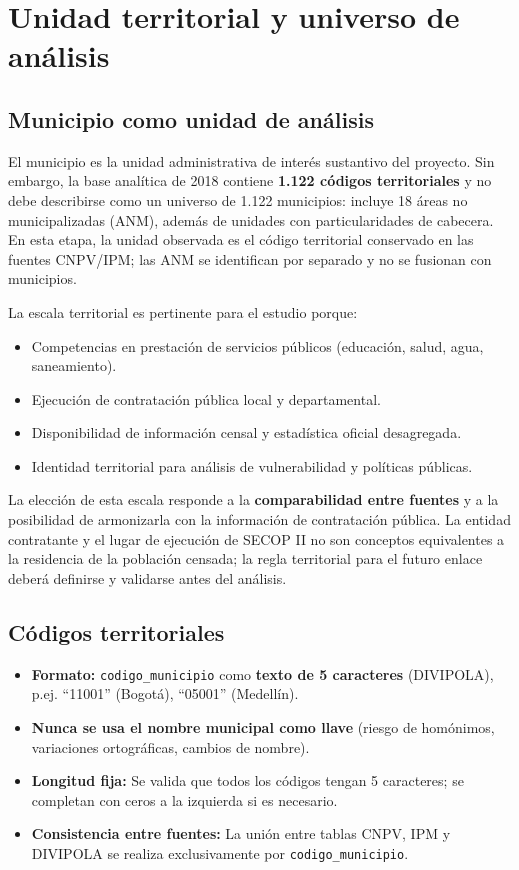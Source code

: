\section{Unidad territorial y universo de análisis}
\label{ch:unidad_analisis}

\subsection{Municipio como unidad de análisis}
\label{sec:municipio_unidad}

El municipio es la unidad administrativa de interés sustantivo del proyecto. Sin embargo, la base analítica de 2018 contiene \textbf{1.122 códigos territoriales} y no debe describirse como un universo de 1.122 municipios: incluye 18 áreas no municipalizadas (ANM), además de unidades con particularidades de cabecera. En esta etapa, la unidad observada es el código territorial conservado en las fuentes CNPV/IPM; las ANM se identifican por separado y no se fusionan con municipios.

La escala territorial es pertinente para el estudio porque:

\begin{itemize}
    \item Competencias en prestación de servicios públicos (educación, salud, agua, saneamiento).
    \item Ejecución de contratación pública local y departamental.
    \item Disponibilidad de información censal y estadística oficial desagregada.
    \item Identidad territorial para análisis de vulnerabilidad y políticas públicas.
\end{itemize}

La elección de esta escala responde a la \textbf{comparabilidad entre fuentes} y a la posibilidad de armonizarla con la información de contratación pública. La entidad contratante y el lugar de ejecución de SECOP II no son conceptos equivalentes a la residencia de la población censada; la regla territorial para el futuro enlace deberá definirse y validarse antes del análisis.

\subsection{Códigos territoriales}
\label{sec:codigos_territoriales}

\begin{itemize}
    \item \textbf{Formato:} \texttt{codigo\_municipio} como \textbf{texto de 5 caracteres} (DIVIPOLA), p.ej. ``11001'' (Bogotá), ``05001'' (Medellín).
    \item \textbf{Nunca se usa el nombre municipal como llave} (riesgo de homónimos, variaciones ortográficas, cambios de nombre).
    \item \textbf{Longitud fija:} Se valida que todos los códigos tengan 5 caracteres; se completan con ceros a la izquierda si es necesario.
    \item \textbf{Consistencia entre fuentes:} La unión entre tablas CNPV, IPM y DIVIPOLA se realiza exclusivamente por \texttt{codigo\_municipio}.
\end{itemize}


